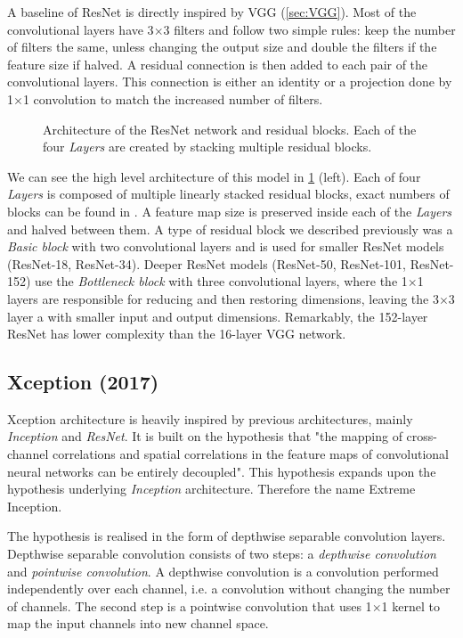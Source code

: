 A baseline of ResNet is directly inspired by VGG (\cref{sec:VGG}). Most of the convolutional layers have 3$\times$3 filters and follow two simple rules: keep the number of filters the same, unless changing the output size and double the filters if the feature size if halved. A residual connection is then added to each pair of the convolutional layers. This connection is either an identity or a projection done by 1$\times$1 convolution to match the increased number of filters. 

\begin{figure}
    \resnetArch
    \caption{Architecture of the ResNet network and residual blocks. Each of the four \textit{Layers} are created by stacking multiple residual blocks.}
    \label{fig:resnet_arch}
\end{figure}

We can see the high level architecture of this model in \cref{fig:resnet_arch} (left). Each of four \textit{Layers} is composed of multiple linearly stacked residual blocks, exact numbers of blocks can be found in \cite[table 1]{bib:resnet}. A feature map size is preserved inside each of the \textit{Layers} and halved between them. A type of residual block we described previously was a \textit{Basic block} with two convolutional layers and is used for smaller ResNet models (ResNet-18, ResNet-34). Deeper ResNet models (ResNet-50, ResNet-101, ResNet-152) use the \textit{Bottleneck block} with three convolutional layers, where the 1$\times$1 layers are responsible for reducing and then restoring dimensions, leaving the 3$\times$3 layer a with smaller input and output dimensions. Remarkably, the 152-layer ResNet has lower complexity than the 16-layer VGG network.



\subsection{Xception (2017)}
\label{sec:xception}
Xception architecture \cite{bib:xception} is heavily inspired by previous architectures, mainly \textit{Inception} and \textit{ResNet}. It is built on the hypothesis that "the mapping of cross-channel correlations and spatial correlations in the feature maps of convolutional neural networks can be
entirely decoupled". This hypothesis expands upon the hypothesis underlying \textit{Inception} architecture. Therefore the name Extreme Inception. 

The hypothesis is realised in the form of depthwise separable convolution layers. Depthwise separable convolution consists of two steps: a \textit{depthwise convolution} and \textit{pointwise convolution}. A depthwise convolution is a convolution performed independently over each channel, i.e. a convolution without changing the number of channels. The second step is a pointwise convolution that uses 1$\times$1 kernel to map the input channels into new channel space.

